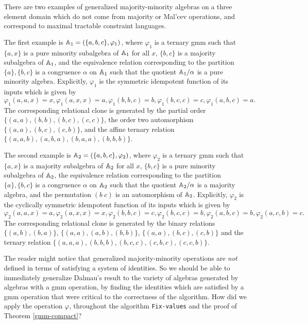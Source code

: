 \documentclass[letterpaper,11pt]{article}
\begin{document}
There are two examples of generalized majority-minority algebras on a three element domain which do not come from majority or Mal'cev operations, and correspond to maximal tractable constraint languages.

\begin{ex}\label{gmm-ex-1} The first example is $\mathbb{A}_1 = (\{a,b,c\}, \varphi_1)$, where $\varphi_1$ is a ternary gmm such that $\{a,x\}$ is a pure minority subalgebra of $\mathbb{A}_1$ for all $x$, $\{b,c\}$ is a majority subalgebra of $\mathbb{A}_1$, and the equivalence relation corresponding to the partition $\{a\}, \{b,c\}$ is a congruence $\alpha$ on $\mathbb{A}_1$ such that the quotient $\mathbb{A}_1/\alpha$ is a pure minority algebra. Explicitly, $\varphi_1$ is the symmetric idempotent function of its inputs which is given by
\[
\varphi_1(a,a,x) = x, \varphi_1(a,x,x) = a, \varphi_1(b,b,c) = b, \varphi_1(b,c,c) = c, \varphi_1(a,b,c) = a.
\]
The corresponding relational clone is generated by the partial order $\{(a,a),(b,b),(b,c),(c,c)\}$, the order two automorphism $\{(a,a),(b,c),(c,b)\}$, and the affine ternary relation $\{(a,a,b),(a,b,a),(b,a,a),(b,b,b)\}$.
\end{ex}

\begin{ex}\label{gmm-ex-2} The second example is $\mathbb{A}_2 = (\{a,b,c\}, \varphi_2)$, where $\varphi_2$ is a ternary gmm such that $\{a,x\}$ is a majority subalgebra of $\mathbb{A}_2$ for all $x$, $\{b,c\}$ is a pure minority subalgebra of $\mathbb{A}_2$, the equivalence relation corresponding to the partition $\{a\}, \{b,c\}$ is a congruence $\alpha$ on $\mathbb{A}_2$ such that the quotient $\mathbb{A}_2/\alpha$ is a majority algebra, and the permutation $(b\; c)$ is an automorphism of $\mathbb{A}_2$. Explicitly, $\varphi_2$ is the cyclically symmetric idempotent function of its inputs which is given by
\[
\varphi_2(a,a,x) = a, \varphi_2(a,x,x) = x, \varphi_2(b,b,c) = c, \varphi_2(b,c,c) = b, \varphi_2(a,b,c) = b, \varphi_2(a,c,b) = c.
\]
The corresponding relational clone is generated by the binary relations $\{(a,b),(b,a)\}$, $\{(a,a),(a,b),(b,b)\}$, $\{(a,a),(b,c),(c,b)\}$ and the ternary relation $\{(a,a,a),(b,b,b),(b,c,c),(c,b,c),(c,c,b)\}$.
\end{ex}

The reader might notice that generalized majority-minority operations are \emph{not} defined in terms of satisfying a system of identities. So we should be able to immediately generalize Dalmau's result to the variety of algebras generated by algebras with a gmm operation, by finding the identities which are satisfied by a gmm operation that were critical to the correctness of the algorithm. How did we apply the operation $\varphi$, throughout the algorithm \texttt{Fix-values} and the proof of Theorem \ref{gmm-compact}?
\end{document}
